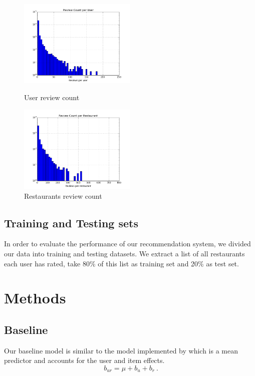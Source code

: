 \documentclass{llncs}
\begin{document}
\begin{figure}
	\begin{minipage}[t]{0.5\textwidth}
		\centering
		\includegraphics[width=2.2in]{fig1.png}
		\caption{User review count}
		\label{fig:side:a}
	\end{minipage}%
	\begin{minipage}[t]{0.5\textwidth}
		\centering
		\includegraphics[width=2.2in]{fig2.png}
		\caption{Restaurants review count}
		\label{fig:side:b}
	\end{minipage}
\end{figure}

\subsection{Training and Testing sets}
%
In order to evaluate the performance of our recommendation system, we divided our data into training and testing datasets. We extract a list of all restaurants each user has rated, take 80\% of this list as training set and 20\% as test set. 

\section{Methods}
\subsection{Baseline}
Our baseline model is similar to the model implemented by\cite{Yehuda} which is a mean predictor and accounts for the user and item effects. 
\begin{equation}
\ b_{ur} = \mu + b_u + b_r \ .
\end{equation}
\end{document}
